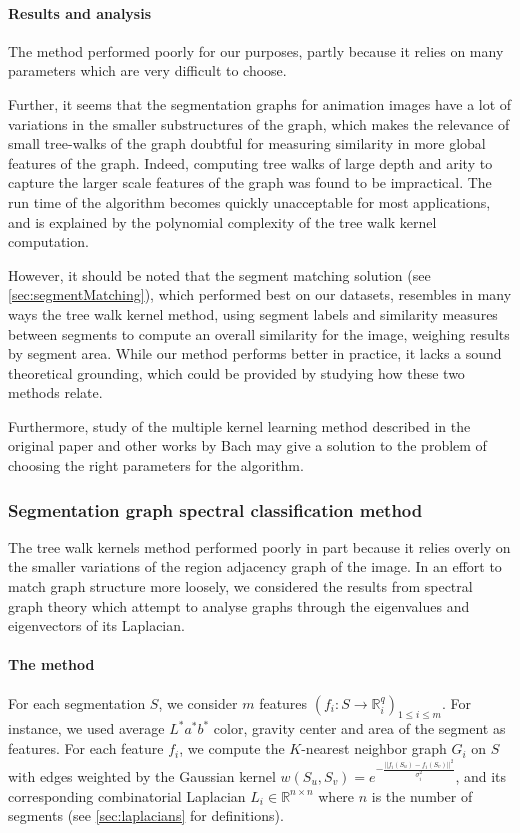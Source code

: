 \paragraph{Results and analysis} The method performed poorly for our purposes, partly because it relies on many parameters which are very difficult to choose.

Further, it seems that the segmentation graphs for animation images have a lot of variations in the smaller substructures of the graph, which makes the relevance of small tree-walks of the graph doubtful for measuring similarity in more global features of the graph. Indeed, computing tree walks of large depth and arity to capture the larger scale features of the graph was found to be impractical. The run time of the algorithm becomes quickly unacceptable for most applications, and is explained by the polynomial complexity of the tree walk kernel computation.

However, it should be noted that the segment matching solution (see \autoref{sec:segmentMatching}), which performed best on our datasets, resembles in many ways the tree walk kernel method, using segment labels and similarity measures between segments to compute an overall similarity for the image, weighing results by segment area. While our method performs better in practice, it lacks a sound theoretical grounding, which could be provided by studying how these two methods relate.

Furthermore, study of the multiple kernel learning method described in the original paper and other works by Bach \cite{bach2004multiple} may give a solution to the problem of choosing the right parameters for the algorithm.

\subsubsection{Segmentation graph spectral classification method}
The tree walk kernels method performed poorly in part because it relies overly on the smaller variations of the region adjacency graph of the image. In an effort to match graph structure more loosely, we considered the results from spectral graph theory which attempt to analyse graphs through the eigenvalues and eigenvectors of its Laplacian. 

\paragraph{The method} For each segmentation $S$, we consider $m$ features $(f_i : S \rightarrow \mathbb{R}_i^q)_{1 \leq i \leq m}$. For instance, we used average $L^*a^*b^*$ color, gravity center and area of the segment as features. For each feature $f_i$, we compute the $K$-nearest neighbor graph $G_i$ on $S$ with edges weighted by the Gaussian kernel $w(S_u,S_v) = e^{-\frac{||f_i(S_u) - f_i(S_v)||^2}{\sigma_i^2}}$, and its corresponding combinatorial Laplacian  $L_i \in \mathbb{R}^{n \times n}$ where $n$ is the number of segments (see \autoref{sec:laplacians} for definitions).

